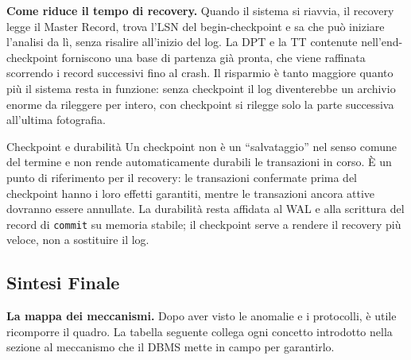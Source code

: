 \documentclass[12pt]{extarticle}
\begin{document}
\medskip
\noindent \textbf{Come riduce il tempo di recovery.} Quando il sistema si riavvia, il recovery legge il Master Record, trova l'LSN del begin-checkpoint e sa che può iniziare l'analisi da lì, senza risalire all'inizio del log. La DPT e la TT contenute nell'end-checkpoint forniscono una base di partenza già pronta, che viene raffinata scorrendo i record successivi fino al crash. Il risparmio è tanto maggiore quanto più il sistema resta in funzione: senza checkpoint il log diventerebbe un archivio enorme da rileggere per intero, con checkpoint si rilegge solo la parte successiva all'ultima fotografia.

\begin{cbox}{Checkpoint e durabilità}
\noindent Un checkpoint non è un ``salvataggio'' nel senso comune del termine e non rende automaticamente durabili le transazioni in corso. È un punto di riferimento per il recovery: le transazioni confermate prima del checkpoint hanno i loro effetti garantiti, mentre le transazioni ancora attive dovranno essere annullate. La durabilità resta affidata al WAL e alla scrittura del record di \texttt{commit} su memoria stabile; il checkpoint serve a rendere il recovery più veloce, non a sostituire il log.
\end{cbox}

\subsection{Sintesi Finale}

\noindent \textbf{La mappa dei meccanismi.} Dopo aver visto le anomalie e i protocolli, è utile ricomporre il quadro. La tabella seguente collega ogni concetto introdotto nella sezione al meccanismo che il DBMS mette in campo per garantirlo.
\end{document}
